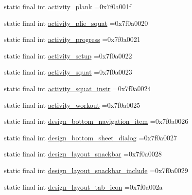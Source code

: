 \begin{DoxyCompactItemize}
\item 
static final int \mbox{\hyperlink{classcom_1_1example_1_1trainawearapplication_1_1_r_1_1layout_aee32c819f64546d816eef1019ec71bfe}{activity\+\_\+plank}} =0x7f0a001f
\item 
static final int \mbox{\hyperlink{classcom_1_1example_1_1trainawearapplication_1_1_r_1_1layout_a90f59a601223c26c44c5d86257e9bfff}{activity\+\_\+plie\+\_\+squat}} =0x7f0a0020
\item 
static final int \mbox{\hyperlink{classcom_1_1example_1_1trainawearapplication_1_1_r_1_1layout_a294253efb588aa67a61203d087ba7e72}{activity\+\_\+progress}} =0x7f0a0021
\item 
static final int \mbox{\hyperlink{classcom_1_1example_1_1trainawearapplication_1_1_r_1_1layout_a0ac4d7988d03111570a7765c91541e8c}{activity\+\_\+setup}} =0x7f0a0022
\item 
static final int \mbox{\hyperlink{classcom_1_1example_1_1trainawearapplication_1_1_r_1_1layout_a752a9cb10df3d7e0a0b11a81f930fb0f}{activity\+\_\+squat}} =0x7f0a0023
\item 
static final int \mbox{\hyperlink{classcom_1_1example_1_1trainawearapplication_1_1_r_1_1layout_aae5ea58400b3120f15fdea2871573ea9}{activity\+\_\+squat\+\_\+instr}} =0x7f0a0024
\item 
static final int \mbox{\hyperlink{classcom_1_1example_1_1trainawearapplication_1_1_r_1_1layout_aa83fde7d1c7a55321588482644b18dac}{activity\+\_\+workout}} =0x7f0a0025
\item 
static final int \mbox{\hyperlink{classcom_1_1example_1_1trainawearapplication_1_1_r_1_1layout_af6afc7ca879e198fef94f4937b05d412}{design\+\_\+bottom\+\_\+navigation\+\_\+item}} =0x7f0a0026
\item 
static final int \mbox{\hyperlink{classcom_1_1example_1_1trainawearapplication_1_1_r_1_1layout_a2af577daca5544a5c24b00324c42a376}{design\+\_\+bottom\+\_\+sheet\+\_\+dialog}} =0x7f0a0027
\item 
static final int \mbox{\hyperlink{classcom_1_1example_1_1trainawearapplication_1_1_r_1_1layout_a001d1096c267d553764b89c26bc3b1ef}{design\+\_\+layout\+\_\+snackbar}} =0x7f0a0028
\item 
static final int \mbox{\hyperlink{classcom_1_1example_1_1trainawearapplication_1_1_r_1_1layout_adf201b01a06f475e0da998c984332f05}{design\+\_\+layout\+\_\+snackbar\+\_\+include}} =0x7f0a0029
\item 
static final int \mbox{\hyperlink{classcom_1_1example_1_1trainawearapplication_1_1_r_1_1layout_a779efc50edcf6f1c16e33d1127c782d1}{design\+\_\+layout\+\_\+tab\+\_\+icon}} =0x7f0a002a

\end{DoxyCompactItemize}
